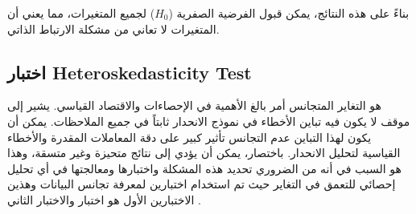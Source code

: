 \documentclass[10pt,a4paper]{report}
\begin{document}
\begin{doublespacing}
بناءً على هذه النتائج، يمكن قبول الفرضية الصفرية ($H_0$) لجميع المتغيرات، مما يعني أن المتغيرات لا تعاني من مشكلة الارتباط الذاتي.
\subsection{اختبار \textenglish{Heteroskedasticity Test}}
هو التغاير المتجانس أمر بالغ الأهمية في الإحصاءات والاقتصاد القياسي. يشير إلى موقف لا يكون فيه تباين الأخطاء في نموذج الانحدار ثابتاً في جميع الملاحظات. يمكن أن يكون لهذا التباين عدم التجانس تأثير كبير على دقة المعاملات المقدرة والأخطاء القياسية لتحليل الانحدار. باختصار، يمكن أن يؤدي إلى نتائج متحيزة وغير متسقة، وهذا هو السبب في أنه من الضروري تحديد هذه المشكلة واختبارها ومعالجتها في أي تحليل إحصائي للتعمق في التغاير حيث تم استخدام اختبارين لمعرفة تجانس البيانات وهذين الاختبارين الأول هو اختبار  والاختبار الثاني .
\begin{table}[H]
	\captionsetup{font=Large}  %
	\fontsize{12}{12}\selectfont
	\centering
	\caption{اختبارات تجانس للمتغيرات}
	\label{tab:17.3}
\end{table}
\end{doublespacing}
\end{document}
